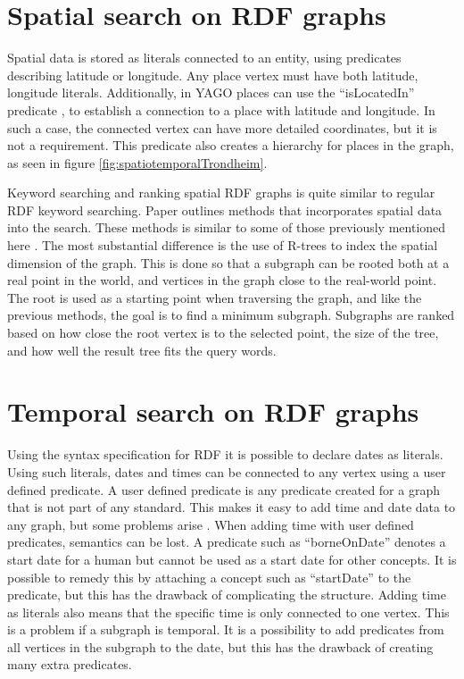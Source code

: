 \section{Spatial search on RDF graphs}
Spatial data is stored as literals connected to an entity, using predicates describing latitude or longitude. Any place vertex must have both latitude, longitude literals. Additionally, in YAGO places can use the ``isLocatedIn'' predicate \cite{hoffart2013yago2}, to establish a connection to a place with latitude and longitude. In such a case, the connected vertex can have more detailed coordinates, but it is not a requirement. This predicate also creates a hierarchy for places in the graph, as seen in figure \ref{fig:spatiotemporalTrondheim}.

Keyword searching and ranking spatial RDF graphs is quite similar to regular RDF keyword searching. Paper \cite{Shi:2016:TRS:2882903.2882941} outlines methods that incorporates spatial data into the search. These methods is similar to some of those previously mentioned here \cite{4812421, Elbassuoni:2011:KSO:2063576.2063615}. The most substantial difference is the use of R-trees to index the spatial dimension of the graph. This is done so that a subgraph can be rooted both at a real point in the world, and vertices in the graph close to the real-world point. The root is used as a starting point when traversing the graph, and like the previous methods, the goal is to find a minimum subgraph. Subgraphs are ranked based on how close the root vertex is to the selected point, the size of the tree, and how well the result tree fits the query words.

\section{Temporal search on RDF graphs}
Using the syntax specification for RDF \cite{beckett2004rdf} it is possible to declare dates as literals. Using such literals, dates and times can be connected to any vertex using a user defined predicate. A user defined predicate is any predicate created for a graph that is not part of any standard. This makes it easy to add time and date data to any graph, but some problems arise \cite{tappolet2009applied}. When adding time with user defined predicates, semantics can be lost. A predicate such as ``borneOnDate'' denotes a start date for a human but cannot be used as a start date for other concepts. It is possible to remedy this by attaching a concept such as ``startDate'' to the predicate, but this has the drawback of complicating the structure. Adding time as literals also means that the specific time is only connected to one vertex. This is a problem if a subgraph is temporal. It is a possibility to add predicates from all vertices in the subgraph to the date, but this has the drawback of creating many extra predicates.

